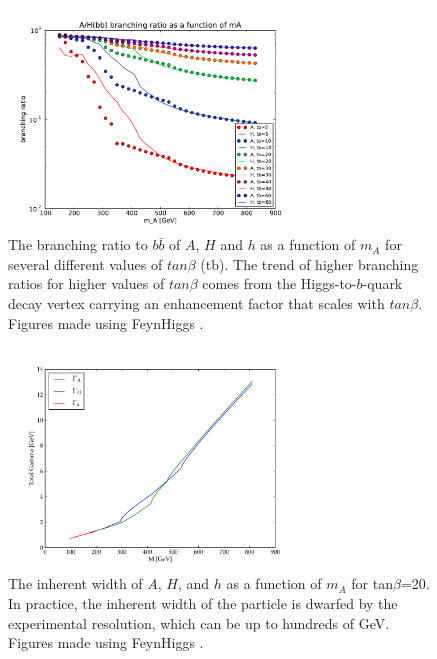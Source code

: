 \begin{figure}
	\centering
	\includegraphics[width=0.7\textwidth]{Theory/figures/mssm_xsec/AH_br_vs_mass.pdf}
	\caption{The branching ratio to $b\bar{b}$ of $A$, $H$ 
    and $h$ as a function of $m_A$ for 
    several different values of $tan\beta$ (tb). The trend of higher branching 
    ratios for higher values of $tan\beta$ comes from the Higgs-to-$b$-quark 
    decay vertex carrying an enhancement factor that scales with $tan\beta$.
    Figures made using FeynHiggs \cite{feynhiggs_1, feynhiggs_2, feynhiggs_3, feynhiggs_4, feynhiggs_5}. 
    \label{fig:br_vs_mass} }
\end{figure}


\begin{figure}
	\centering
	\includegraphics[width=0.7\textwidth]{Theory/figures/gamma.pdf}
	\caption{The inherent width of $A$, $H$, and $h$ 
    as a function of $m_A$ for tan$\beta$=20.  
    In practice, the inherent width of the particle is dwarfed by the experimental 
    resolution, which can be up to hundreds of GeV.  
    Figures made using FeynHiggs \cite{feynhiggs_1, feynhiggs_2, feynhiggs_3, feynhiggs_4, feynhiggs_5}. \label{fig:width}}
\end{figure}



